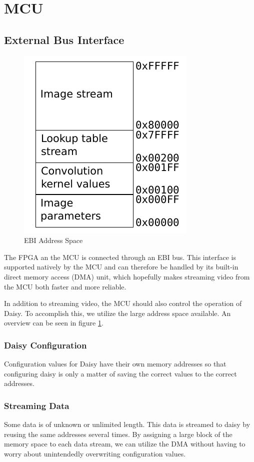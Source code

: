 \section{MCU}

\subsection{External Bus Interface}
\begin{figure}
    \centering
    \includegraphics[]{img/EbiAddressSpace.pdf}
    \caption{EBI Address Space}
    \label{fig:EbiAddressSpace}
\end{figure}
The FPGA an the MCU is connected through an EBI bus.
This interface is supported natively by the MCU and can therefore be handled by its built-in direct memory access (DMA) unit, which hopefully makes streaming video from the MCU both faster and more reliable.

In addition to streaming video, the MCU should also control the operation of Daisy.
To accomplish this, we utilize the large address space available.
An overview can be seen in figure \ref{fig:EbiAddressSpace}.

\subsubsection{Daisy Configuration}
Configuration values for Daisy have their own memory addresses so that configuring daisy is only a matter of saving the correct values to the correct addresses.

\subsubsection{Streaming Data}
Some data is of unknown or unlimited length. This data is streamed to daisy by reusing the same addresses several times.
By assigning a large block of the memory space to each data stream, we can utilize the DMA without having to worry about unintendedly overwriting configuration values.

